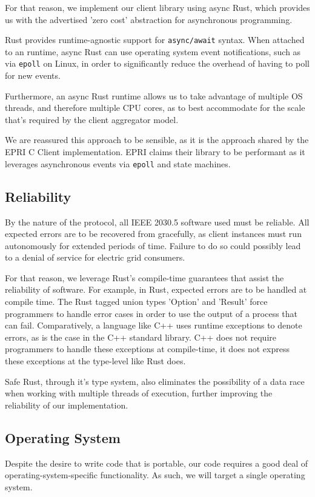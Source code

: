 For that reason, we implement our client library using async Rust, which provides us with the advertised 'zero cost' abstraction for asynchronous programming.

Rust provides runtime-agnostic support for \texttt{async/await} syntax.
When attached to an runtime, async Rust can use operating system event notifications, such as via \texttt{epoll} on Linux, in order to significantly reduce the overhead of having to poll for new events.

Furthermore, an async Rust runtime allows us to take advantage of multiple OS threads, and therefore multiple CPU cores, as to best accommodate for the scale that's required by the client aggregator model.

We are reassured this approach to be sensible, as it is the approach shared by the EPRI C Client implementation. EPRI claims their library to be performant as it leverages asynchronous events via \texttt{epoll} and state machines.


\subsection{Reliability}
By the nature of the protocol, all IEEE 2030.5 software used must be reliable. All expected errors are to be recovered from gracefully, as client instances must run autonomously for extended periods of time. Failure to do so could possibly lead to a denial of service for electric grid consumers.

For that reason, we leverage Rust's compile-time guarantees that assist the reliability of software. For example, in Rust, expected errors are to be handled at compile time. The Rust tagged union types 'Option' and 'Result' force programmers to handle error cases in order to use the output of a process that can fail. Comparatively, a language like C++ uses runtime exceptions to denote errors, as is the case in the C++ standard library. C++ does not require programmers to handle these exceptions at compile-time, it does not express these exceptions at the type-level like Rust does.

Safe Rust, through it's type system, also eliminates the possibility of a data race when working with multiple threads of execution, further improving the reliability of our implementation.

\subsection{Operating System}
Despite the desire to write code that is portable, our code requires a good deal of operating-system-specific functionality. As such, we will target a single operating system. 

